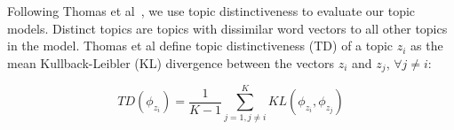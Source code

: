 Following Thomas et al~\cite{Thomas-etal:2011}, we use topic distinctiveness
to evaluate our topic models.
Distinct topics are topics with dissimilar word vectors to all other topics in the model.
Thomas et al define topic distinctiveness (TD) of a topic $z_i$ as the mean
Kullback-Leibler (KL) divergence between the vectors $z_i$ and $z_j$, $\forall j \neq i$:

\begin{equation}
TD(\phi_{z_i}) = 
\frac{1}{K - 1}
\sum_{j=1,j \neq i}^{K}
KL(\phi_{z_i}, \phi_{z_j})
\label{eq:topicdistinctiveness}
\end{equation}

